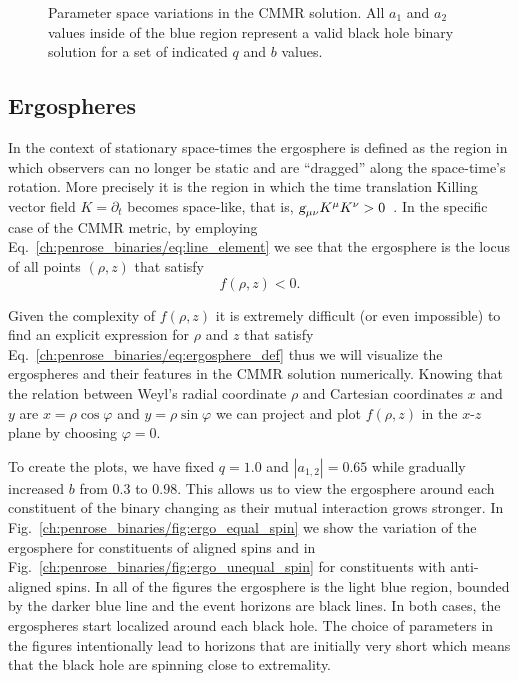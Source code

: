 \begin{figure}
{    \label{ch:penrose_binaries/fig:par_reg_i}
  }
  \caption{Parameter space variations in the CMMR solution. All $a_1$ and $a_2$ values inside of the blue region represent a valid black hole binary solution for a set of indicated $q$ and $b$ values.}
  \label{ch:penrose_binaries/fig:parameter_space}
\end{figure}

\subsection{Ergospheres}

In the context of stationary space-times the ergosphere is defined as the region in which observers can no longer be static and are ``dragged'' along the space-time's rotation. More precisely it is the region in which the time translation Killing vector field $K = \partial_t$ becomes space-like, that is, $\mtrtens{\mu}{\nu}\tens{K}{\mu}{}\tens{K}{\nu}{} >0$~\cite{carroll}. In the specific case of the CMMR metric, by employing Eq.~\eqref{ch:penrose_binaries/eq:line_element} we see that the ergosphere is the locus of all points $(\rho,z)$ that satisfy
%
\begin{equation}
  f(\rho,z) < 0.
  \label{ch:penrose_binaries/eq:ergosphere_def}
\end{equation}

Given the complexity of $f(\rho,z)$ it is extremely difficult (or even impossible) to find an explicit expression for $\rho$ and $z$ that satisfy Eq.~\eqref{ch:penrose_binaries/eq:ergosphere_def} thus we will visualize the ergospheres and their features in the CMMR solution numerically. Knowing that the relation between Weyl's radial coordinate $\rho$ and Cartesian coordinates $x$ and $y$ are $x = \rho\cos\varphi$ and $y = \rho\sin\varphi$ we can project and plot $f(\rho,z)$ in the $x$-$z$ plane by choosing $\varphi=0$.

To create the plots, we have fixed $q = 1.0$ and $|a_{1,2}| = 0.65$ while gradually increased $b$ from $0.3$ to $0.98$. This allows us to view the ergosphere around each constituent of the binary changing as their mutual interaction grows stronger. In Fig.~\ref{ch:penrose_binaries/fig:ergo_equal_spin} we show the variation of the ergosphere for constituents of aligned spins and in Fig.~\ref{ch:penrose_binaries/fig:ergo_unequal_spin} for constituents with anti-aligned spins. In all of the figures the ergosphere is the light blue region, bounded by the darker blue line and the event horizons are black lines. In both cases, the ergospheres start localized around each black hole. The choice of parameters in the figures intentionally lead to horizons that are initially very short which means that the black hole are spinning close to extremality.

